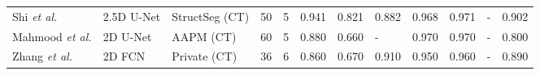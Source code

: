 \documentclass[lettersize,journal]{IEEEtran}
\begin{document}
{\begin{table*}[ht!]
{\begin{tabular}{@{}llllllllllll@{}}
Shi {\it{et al.}} \cite{89}                                                                    & 2.5D U-Net                                                  & StructSeg (CT) \cite{1}                                                                & 50                                              & 5                                             & 0.941                                                 & 0.821                                                 & 0.882                                                 & 0.968                                         & 0.971                                         & -                                                     & 0.902                                         \\
Mahmood {\it{et al.}} \cite{90}                                                                & 2D U-Net                                                    & AAPM (CT) \cite{31}                                                                    & 60                                              & 5                                             & 0.880                                                 & 0.660                                                 & -                                                     & 0.970                                         & 0.970                                         & -                                                     & 0.800                                         \\
Zhang {\it{et al.}} \cite{91}                                                                 & 2D FCN                                                      & Private (CT)                                                                          & 36                                              & 6                                             & 0.860                                                 & 0.670                                                 & 0.910                                                 & 0.950                                         & 0.960                                         & -                                                     & 0.890       \\ 
\bottomrule
\end{tabular}%
}
\end{table*}

}
\end{document}
